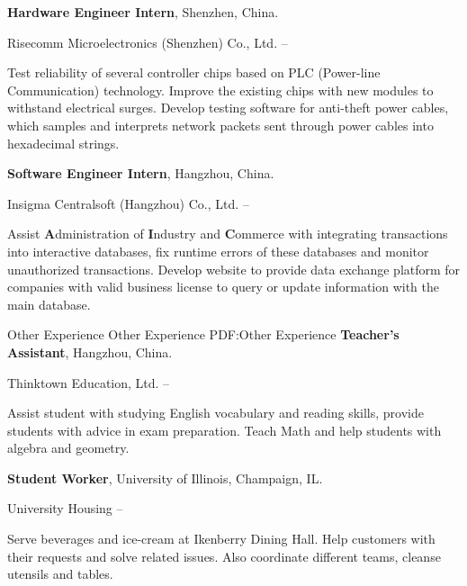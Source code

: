 \documentclass[letterpaper,MMMyyyy,nonstopmode]{simpleresumecv}
\begin{document}
\begin{Body}
\Entry
\textbf{Hardware Engineer Intern}, Shenzhen, China.

\Gap
\BulletItem
Risecomm Microelectronics (Shenzhen) Co., Ltd.
\hfill
{} --
\begin{Detail}
\SubBulletItem
Test reliability of several controller chips based on PLC (Power-line Communication) technology. Improve the existing chips with new modules to withstand electrical surges.
\SubBulletItem
Develop testing software for anti-theft power cables, which samples and interprets network packets sent through power cables into hexadecimal strings.
\end{Detail}

\Entry
\textbf{Software Engineer Intern}, Hangzhou, China.

\Gap
\BulletItem
Insigma Centralsoft (Hangzhou) Co., Ltd.
\hfill
{} --
\begin{Detail}
\SubBulletItem
Assist \textbf{A}dministration of \textbf{I}ndustry and \textbf{C}ommerce with integrating transactions into interactive databases, fix runtime errors of these databases and monitor unauthorized transactions.
\SubBulletItem
Develop website to provide data exchange platform for companies with valid business license to query or update information with the main database.
\end{Detail}

\Section
{Other Experience}
{Other Experience}
{PDF:Other Experience}
\Entry
\textbf{Teacher's Assistant}, Hangzhou, China.

\Gap
\BulletItem
Thinktown Education, Ltd.
\hfill
{} --
\begin{Detail}
\SubBulletItem
Assist student with studying English vocabulary and reading skills, provide students with advice in exam preparation.
\SubBulletItem
Teach Math and help students with algebra and geometry.
\end{Detail}


\Entry
\textbf{Student Worker}, University of Illinois, Champaign, IL.

\Gap
\BulletItem
University Housing
\hfill
{} --
\begin{Detail}
\SubBulletItem
Serve beverages and ice-cream at Ikenberry Dining Hall. Help customers with their requests and solve related issues.
\SubBulletItem
Also coordinate different teams, cleanse utensils and tables.
\end{Detail}



\end{Body}
\end{document}
